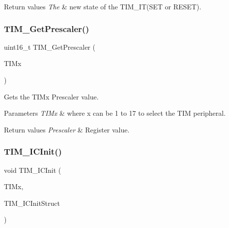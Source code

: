 \begin{DoxyRetVals}{Return values}
{\em The} & new state of the T\+I\+M\+\_\+\+I\+T(\+S\+E\+T or R\+E\+S\+E\+T). \\
\hline
\end{DoxyRetVals}
\mbox{\label{group___t_i_m___private___functions_ga427eb6e533480e02a27cd0ca876183d6}} 
\subsubsection{\texorpdfstring{TIM\_GetPrescaler()}{TIM\_GetPrescaler()}}
{\footnotesize\ttfamily uint16\+\_\+t T\+I\+M\+\_\+\+Get\+Prescaler (\begin{DoxyParamCaption}\item[{\mbox{\hyperlink{struct_t_i_m___type_def}{T\+I\+M\+\_\+\+Type\+Def}} $\ast$}]{T\+I\+Mx }\end{DoxyParamCaption})}



Gets the T\+I\+Mx Prescaler value. 


\begin{DoxyParams}{Parameters}
{\em T\+I\+Mx} & where x can be 1 to 17 to select the T\+IM peripheral. \\
\hline
\end{DoxyParams}

\begin{DoxyRetVals}{Return values}
{\em Prescaler} & Register value. \\
\hline
\end{DoxyRetVals}
\mbox{\label{group___t_i_m___private___functions_ga9e6a153dd6552e4e1188eba227316f7f}} 
\subsubsection{\texorpdfstring{TIM\_ICInit()}{TIM\_ICInit()}}
{\footnotesize\ttfamily void T\+I\+M\+\_\+\+I\+C\+Init (\begin{DoxyParamCaption}\item[{\mbox{\hyperlink{struct_t_i_m___type_def}{T\+I\+M\+\_\+\+Type\+Def}} $\ast$}]{T\+I\+Mx,  }\item[{\mbox{\hyperlink{struct_t_i_m___i_c_init_type_def}{T\+I\+M\+\_\+\+I\+C\+Init\+Type\+Def}} $\ast$}]{T\+I\+M\+\_\+\+I\+C\+Init\+Struct }\end{DoxyParamCaption})}



